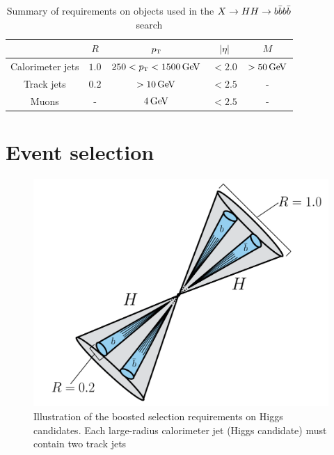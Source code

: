 \begin{table}[h!]
\centering
\captionsetup{justification=centering}

\hspace{-10pt}
\begin{tabular}{|c|c|c|c|c|}
\hline
& $R$ & $p_{\textrm{\footnotesize\sc t}} $ & $|\eta|$ & $M$ \\ \hline
Calorimeter jets & $1.0$ & $250 < \pT < 1500 \GeV$ & $ < 2.0$ & $ > 50 \GeV$ \\ \hline
Track jets & $0.2$ & $> 10 \GeV$ & $< 2.5$ & - \\ \hline
Muons & - & $4 \GeV$ & $< 2.5$ & - \\ \hline
\end{tabular}

\caption{
Summary of requirements on objects used in the $X\to HH \to b\bar{b}b\bar{b}$ search
}
\label{tab:4b_req}
\end{table}

\section{Event selection}

\begin{figure}[h!]
  \centering
  \captionsetup{justification=centering}

  \includegraphics[width=\textwidth]{figures/Boosted_HH_cartoon}
  \caption{Illustration of the boosted selection requirements on Higgs candidates. Each large-radius calorimeter jet (Higgs candidate) must contain two track jets}
  \label{fig:BoostedCartoon}
\end{figure}

